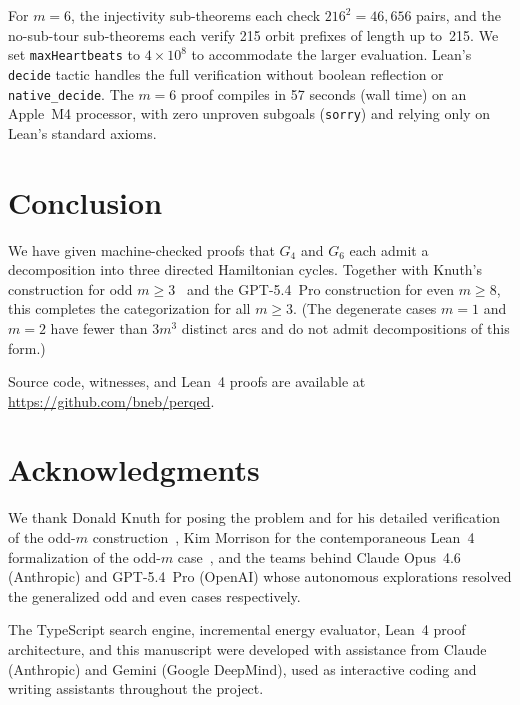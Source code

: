 \documentclass[11pt]{article}
\theoremstyle{plain}
\begin{document}
For $m=6$, the injectivity sub-theorems each check $216^2 = 46{,}656$ pairs,
and the no-sub-tour sub-theorems each verify 215 orbit prefixes of length
up to~215. We set \texttt{maxHeartbeats} to $4 \times 10^8$ to accommodate
the larger evaluation. Lean's \texttt{decide} tactic handles the full
verification without boolean reflection or \texttt{native\_decide}.
The $m=6$ proof compiles in 57 seconds (wall time) on an Apple~M4
processor, with zero unproven subgoals (\texttt{sorry}) and relying
only on Lean's standard axioms.

\section{Conclusion}

We have given machine-checked proofs that $G_4$ and $G_6$ each admit a
decomposition into three directed Hamiltonian cycles. Together with
Knuth's construction for odd $m \ge 3$~\cite{knuth2026} and the
GPT-5.4~Pro construction for even $m \ge 8$, this completes the
categorization for all $m \ge 3$.
(The degenerate cases $m=1$ and $m=2$ have fewer than $3m^3$ distinct arcs
and do not admit decompositions of this form.)

Source code, witnesses, and Lean~4 proofs are available at
\url{https://github.com/bneb/perqed}.

\section*{Acknowledgments}

We thank Donald Knuth for posing the problem and for his detailed
verification of the odd-$m$ construction~\cite{knuth2026}, Kim Morrison
for the contemporaneous Lean~4 formalization of the odd-$m$
case~\cite{morrison2026}, and the teams behind Claude Opus~4.6 (Anthropic)
and GPT-5.4~Pro (OpenAI) whose autonomous explorations resolved the
generalized odd and even cases respectively.

The TypeScript search engine, incremental energy evaluator, Lean~4 proof
architecture, and this manuscript were developed with assistance from
Claude (Anthropic) and Gemini (Google DeepMind), used as interactive
coding and writing assistants throughout the project.
\end{document}
